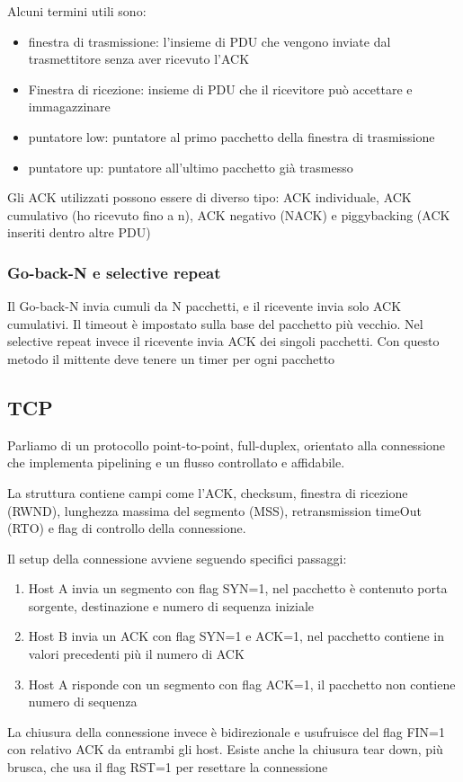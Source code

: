 \documentclass[12pt, a4paper]{article}
\begin{document}
Alcuni termini utili sono:
\begin{itemize}
    \item finestra di trasmissione: l'insieme di PDU che vengono inviate dal trasmettitore senza aver ricevuto 
    l'ACK
    \item Finestra di ricezione: insieme di PDU che il ricevitore può accettare e immagazzinare
    \item puntatore low: puntatore al primo pacchetto della finestra di trasmissione
    \item puntatore up: puntatore all'ultimo pacchetto già trasmesso
\end{itemize}

Gli ACK utilizzati possono essere di diverso tipo: ACK individuale, ACK cumulativo (ho ricevuto fino a n), ACK
negativo (NACK) e piggybacking (ACK inseriti dentro altre PDU)

\subsubsection*{Go-back-N e selective repeat}
Il Go-back-N invia cumuli da N pacchetti, e il ricevente invia solo ACK cumulativi. Il timeout è impostato sulla
base del pacchetto più vecchio. Nel selective repeat invece il ricevente invia ACK dei singoli pacchetti. Con
questo metodo il mittente deve tenere un timer per ogni pacchetto 

\subsection{TCP}
Parliamo di un protocollo point-to-point, full-duplex, orientato alla connessione che implementa pipelining e
un flusso controllato e affidabile.

La struttura contiene campi come l'ACK, checksum, finestra di ricezione (RWND), lunghezza massima del segmento 
(MSS), retransmission timeOut (RTO) e flag di controllo della connessione.

Il setup della connessione avviene seguendo specifici passaggi:
\begin{enumerate}
    \item Host A invia un segmento con flag SYN=1, nel pacchetto è contenuto porta sorgente, destinazione e 
    numero di sequenza iniziale
    \item Host B invia un ACK con flag SYN=1 e ACK=1, nel pacchetto contiene in valori precedenti più il numero
     di ACK
    \item Host A  risponde con un segmento con flag ACK=1, il pacchetto non contiene numero di sequenza
\end{enumerate}
La chiusura della connessione invece è bidirezionale e usufruisce del flag FIN=1 con relativo ACK da entrambi gli
host. Esiste anche la chiusura tear down, più brusca, che usa il flag RST=1 per resettare la connessione
\end{document}
